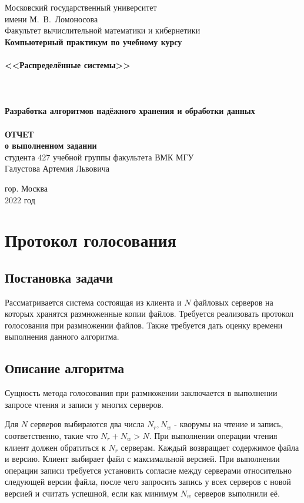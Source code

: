 \documentclass[a4paper,12pt,titlepage,finall]{article}
\begin{document}
\begin{titlepage}
    \begin{center}
	{\small \sc Московский государственный университет \\имени М.~В.~Ломоносова\\
	Факультет вычислительной математики и кибернетики\\}
	\hrulefill
	\vfill
	{\large \bf Компьютерный практикум по учебному курсу}\\
	~\\
	{\Large \bf <<Распределённые системы>>}\\ 
	~\\
	~\\
	~\\
	{\bf Разработка алгоритмов надёжного хранения и обработки данных}\\
	~\\
	{\large \bf ОТЧЕТ}\\
	{\bf о выполненном задании}\\
	{студента 427 учебной группы факультета ВМК МГУ}\\
	{Галустова Артемия Львовича}
    \end{center}
    
    \begin{center}
	\vfill
	{\small гор. Москва\\2022 год}
    \end{center}
\end{titlepage}

\tableofcontents
\newpage
\section{Протокол голосования}
\subsection{Постановка задачи}
Рассматривается система состоящая из клиента и $N$ файловых серверов на которых хранятся размноженные копии файлов. Требуется реализовать протокол голосования при размножении файлов. Также требуется дать оценку времени выполнения данного алгоритма.
\subsection{Описание алгоритма}
Сущность метода голосования при размножении заключается в выполнении запросе чтения и записи у многих серверов.
\par
Для $N$ серверов выбираются два числа $N_r, N_w$ - кворумы на чтение и запись, соответственно, такие что $N_r + N_w > N$. При выполнении операции чтения клиент должен обратиться к $N_r$ серверам. Каждый возвращает содержимое файла и версию. Клиент выбирает файл с максимальной версией. При выполнении операции записи требуется установить согласие между серверами относительно следующей версии файла, после чего запросить запись у всех серверов с новой версией и считать успешной, если как минимум $N_w$ серверов выполнили её.
\end{document}
